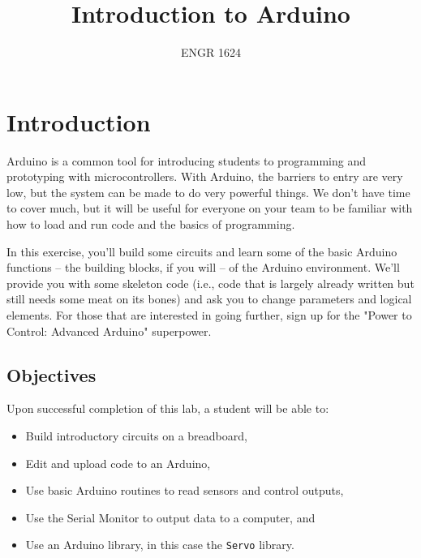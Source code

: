 \documentclass[11pt]{article} %
\title{Introduction to Arduino}
\author{ENGR 1624}
\date{} %
\begin{document}
\maketitle


\section*{Introduction}

Arduino is a common tool for introducing students to programming and prototyping with microcontrollers. With Arduino, the barriers to entry are very low, but the system can be made to do very powerful things. We don’t have time to cover much, but it will be useful for everyone on your team to be familiar with how to load and run code and the basics of programming.

In this exercise, you’ll build some circuits and learn some of the basic Arduino functions -- the building blocks, if you will -- of the Arduino environment. We’ll provide you with some skeleton code (i.e., code that is largely already written but still needs some meat on its bones) and ask you to change parameters and logical elements. For those that are interested in going further, sign up for the "Power to Control: Advanced Arduino" superpower.%

\subsection*{Objectives}

Upon successful completion of this lab, a student will be able to:
\begin{itemize}
\item Build introductory circuits on a breadboard,
\item Edit and upload code to an Arduino,
\item Use basic Arduino routines to read sensors and control outputs,
\item Use the Serial Monitor to output data to a computer, and
\item Use an Arduino library, in this case the \verb|Servo| library.
\end{itemize}
\end{document}
